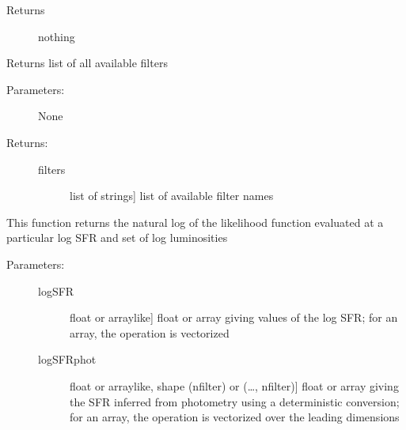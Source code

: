 \documentclass[letterpaper,10pt,english]{sphinxmanual}
\begin{document}
\begin{fulllineitems}
\begin{fulllineitems}
\begin{description}
\begin{description}
\end{description}

\item[{Returns}] \leavevmode
nothing

\end{description}

\end{fulllineitems}


\begin{fulllineitems}
\label{\detokenize{sfr_slug:slugpy.sfr_slug.sfr_slug.filters}}
Returns list of all available filters
\begin{description}
\item[{Parameters:}] \leavevmode
None

\item[{Returns:}] \leavevmode\begin{description}
\item[{filters}] \leavevmode{[}list of strings{]}
list of available filter names

\end{description}

\end{description}

\end{fulllineitems}


\begin{fulllineitems}
\label{\detokenize{sfr_slug:slugpy.sfr_slug.sfr_slug.logL}}
This function returns the natural log of the likelihood
function evaluated at a particular log SFR and set of log
luminosities
\begin{description}
\item[{Parameters:}] \leavevmode\begin{description}
\item[{logSFR}] \leavevmode{[}float or arraylike{]}
float or array giving values of the log SFR; for an
array, the operation is vectorized

\item[{logSFRphot}] \leavevmode{[}float or arraylike, shape (nfilter) or (…, nfilter){]}
float or array giving the SFR inferred from photometry using a
deterministic conversion; for an array, the operation is
vectorized over the leading dimensions


\end{description}
\end{description}
\end{fulllineitems}
\end{fulllineitems}
\end{document}
